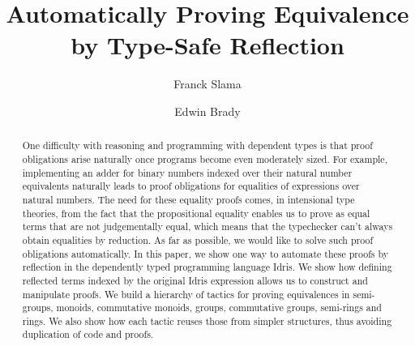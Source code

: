 \documentclass{llncs}
\begin{document}
%
\pagestyle{headings}  %

\mainmatter              %
%
\title{Automatically Proving Equivalence by Type-Safe Reflection}
%
%
\author{Franck Slama \and Edwin Brady}

\maketitle              %

\begin{abstract}
One difficulty with reasoning and programming with dependent types is that proof obligations arise naturally once programs become even moderately sized. For example,
implementing an adder for binary numbers indexed over their natural number
equivalents naturally leads to proof obligations for equalities of expressions
over natural numbers. The need for these equality proofs comes, in intensional
type theories, from the fact that the propositional equality enables us to
prove as equal terms that are not judgementally equal, which means that the
typechecker can't always obtain equalities by reduction.  As far as possible,
we would like to solve such proof obligations automatically. In this paper, we
show one way to automate these proofs by reflection in the dependently typed
programming language Idris.  We show how defining reflected terms indexed by
the original Idris expression allows us to construct and manipulate proofs. We
build a hierarchy of tactics for proving equivalences in semi-groups, monoids,
commutative monoids, groups, commutative groups, semi-rings and rings. We also
show how each tactic reuses those from simpler structures, thus avoiding
duplication of code and proofs.


\end{abstract}
%


\end{document}
